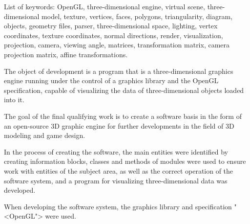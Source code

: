 List of keywords: OpenGL, three-dimensional engine, virtual scene, three-dimensional model, texture, vertices, faces, polygons, triangularity, diagram, objects, geometry files, parser, three-dimensional space, lighting, vertex coordinates, texture coordinates, normal directions, render, visualization, projection, camera, viewing angle, matrices, transformation matrix, camera projection matrix, affine transformations.

The object of development is a program that is a three-dimensional graphics engine running under the control of a graphics library and the OpenGL specification, capable of visualizing the data of three-dimensional objects loaded into it.

The goal of the final qualifying work is to create a software basis in the form of an open-source 3D graphic engine for further developments in the field of 3D modeling and game design.

In the process of creating the software, the main entities were identified by creating information blocks, classes and methods of modules were used to ensure work with entities of the subject area, as well as the correct operation of the software system, and a program for visualizing three-dimensional data was developed.

When developing the software system, the graphics library and specification "<OpenGL"> were used.
